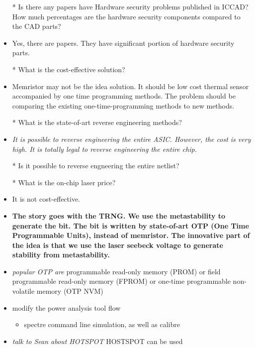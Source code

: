\documentclass[]{article}
\newcommand{\todo}[1]{{\color{red}\textbf{#1}}}
\newcommand{\solved}[1]{{\color{blue}\textit{#1}}}
\begin{document}
\begin{itemize}
                \item [*] Is there any papers have Hardware security problems
                published in ICCAD? How much percentages are the hardware
                security components compared to the CAD parts?
                \item Yes, there are papers. They have significant portion
                of hardware security parts.
                \item [*] What is the cost-effective solution?
                \item Memristor may not be the idea solution. It should be low
                cost thermal sensor accompanied by one time programming methods.
                The problem should be comparing the existing
                one-time-programming methods to new methods.
                \item [*] What is the state-of-art reverse engineering methods?
                \item \solved{It is possible to reverse engineering the entire ASIC.
                However, the cost is very high. It is totally legal to reverse
                engineering the entire chip.}
                \item [*] Is it possible to reverse engneering the entire
                netlist?
                \item [*] What is the on-chip laser price?
                \item It is not cost-effective.
                \item \todo{The story goes with the TRNG. We use the metastability
                to generate the bit. The bit is written by state-of-art OTP (One
                Time Programmable Units), instead of memristor. The innovative
                part of the idea is that we use the laser seebeck voltage to
                generate stability from metastability.}
                \item \solved{popular OTP are} programmable read-only memory
                (PROM) or field programmable read-only memory (FPROM) or
                one-time programmable non-volatile memory (OTP NVM) 
                \item modify the power analysis tool flow
                    \begin{itemize}
                        \item spectre command line simulation, as well as calibre
                    \end{itemize}
                \item \solved{talk to Sean about HOTSPOT} HOSTSPOT can be used

\end{itemize}
\end{document}
